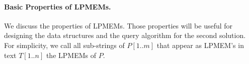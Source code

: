 \documentclass[smallabstract,smallcaptions]{dccpaper}
\newtheorem{lemma}{Lemma}
\newenvironment{proof}{\trivlist\item[]\emph{Proof}:}%
{\unskip\nobreak\hskip 1em plus 1fil\nobreak$\Box$
	\parfillskip=0pt%
	\endtrivlist}
\begin{document}
\paragraph{Basic Properties of LPMEMs.} We discuss the properties of LPMEMs.
Those properties will be useful for designing the data structures and the query algorithm for the second solution.
For simplicity, we call all sub-strings of $P[1..m]$ that appear as LPMEM's in text $T[1..n]$ the LPMEMs of $P$.
%
\end{document}
